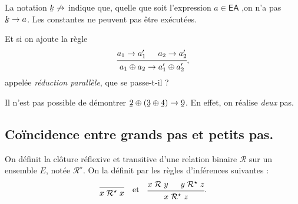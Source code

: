 \documentclass[../main]{subfiles}
\begin{document}
  \begin{rmk}
    La notation $\ubar k \not\to$ indique que, quelle que soit l'expression $a \in \mathsf{EA}$ ,on n'a pas $\ubar k \to a$.
    Les constantes ne peuvent pas être exécutées.
  \end{rmk}

  \begin{exo}
    Et si on ajoute la règle \[
    \begin{prooftree}
      \hypo{a_1 \to a_1'} \hypo{a_2 \to a_2'}
      \infer 2{a_1 \oplus a_2 \to a_1' \oplus a_2'}
    \end{prooftree}
    ,\]
    appelée \textit{réduction parallèle}, que se passe-t-il ?
  \end{exo}

  \begin{rmk}
    Il n'est pas possible de démontrer $\ubar 2 \oplus (\ubar 3 \oplus \ubar 4) \to \ubar 9$.
    En effet, on réalise \textit{deux} pas.
  \end{rmk}

  \subsection{Coïncidence entre grands pas et petits pas.}

  On définit la clôture réflexive et transitive d'une relation binaire $\mathcal{R}$ sur un ensemble $E$, notée $\mathcal{R}^\star$.
  On la définit par les règles d'inférences suivantes :
  \[
  \begin{prooftree}
    \infer 0{x \mathrel{\mathcal{R}^\star} x}
  \end{prooftree}
  \quad\text{et}\quad
  \begin{prooftree}
    \hypo{x \mathrel{\mathcal{R}} y}
    \hypo{y \mathrel{\mathcal{R}^\star} z}
    \infer 2{x \mathrel{\mathcal{R}^\star} z}
  \end{prooftree}
  .\]
\end{document}
